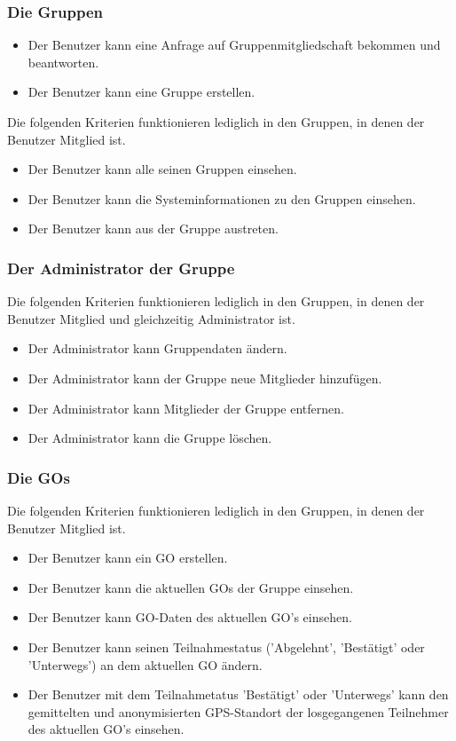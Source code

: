 \documentclass[parskip=full]{scrartcl}
\begin{document}
\subsubsection*{Die Gruppen}
	\begin{itemize}
	 	\item Der Benutzer kann eine Anfrage auf Gruppenmitgliedschaft bekommen und beantworten.
	 	\item Der Benutzer kann eine Gruppe erstellen.
	 \end{itemize}
Die folgenden Kriterien funktionieren lediglich in den Gruppen, in denen der Benutzer Mitglied ist.
	 \begin{itemize}
	 	\item Der Benutzer kann alle seinen Gruppen einsehen.
	 	\item Der Benutzer kann die Systeminformationen zu den Gruppen einsehen.
	 	\item Der Benutzer kann aus der Gruppe austreten.
	\end{itemize}
	
\subsubsection*{Der \gls{Administrator} der Gruppe}
	Die folgenden Kriterien funktionieren lediglich in den Gruppen, in denen der Benutzer Mitglied und gleichzeitig Administrator ist.
	\begin{itemize}
		\item Der Administrator kann Gruppendaten ändern.
		\item Der Administrator kann der Gruppe neue Mitglieder hinzufügen.
		\item Der Administrator kann Mitglieder der Gruppe entfernen.
		\item Der Administrator kann die Gruppe löschen.  
	\end{itemize}
	
\subsubsection*{Die \glspl{GO}}
	Die folgenden Kriterien funktionieren lediglich in den Gruppen, in denen der Benutzer Mitglied ist.
	\begin{itemize}
		\item Der Benutzer kann ein GO erstellen.
		\item Der Benutzer kann die aktuellen GOs der Gruppe einsehen.
		\item Der Benutzer kann GO-Daten des aktuellen GO's einsehen.
		\item Der Benutzer kann seinen Teilnahmestatus  ('Abgelehnt', 'Bestätigt' oder 'Unterwegs') an dem aktuellen GO ändern.
		\item Der Benutzer mit dem Teilnahmetatus 'Bestätigt' oder 'Unterwegs' kann den gemittelten und anonymisierten GPS-Standort der losgegangenen Teilnehmer des aktuellen GO's einsehen.
	\end{itemize}
	
\end{document}
